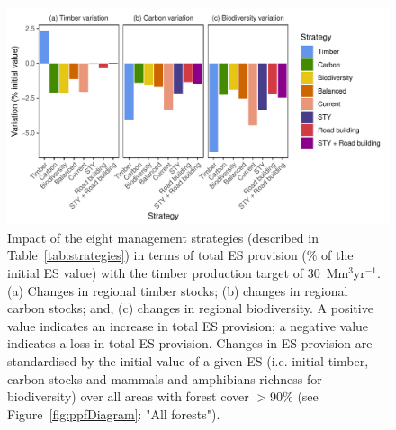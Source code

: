 \documentclass[12pt]{article}
\begin{document}
\begin{figure}
    \centering
    \includegraphics[width=\linewidth]{graphs/costsScenario}
    \caption{Impact of the eight management strategies (described in Table~\ref{tab:strategies}) in terms of total ES provision (\% of the initial ES value) with the timber production target of 30~Mm$^3$yr$^{-1}$. (a) Changes in regional timber stocks; (b) changes in regional carbon stocks; and, (c) changes in regional biodiversity. A positive value indicates an increase in total ES provision; a negative value indicates a loss in total ES provision. Changes in ES provision are standardised by the initial value of a given ES (i.e. initial timber, carbon stocks and mammals and amphibians richness for biodiversity) over all areas with forest cover $>$90\% (see Figure~\ref{fig:ppfDiagram}: "All forests"). 
 }
    \label{fig:scenESProv}
\end{figure}
\end{document}
